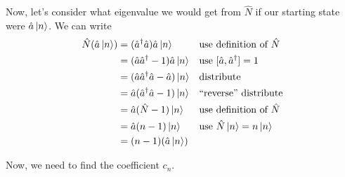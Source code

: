 \begin{questions}
		\contdnewpg
		\question Now, let's consider what eigenvalue we would get from $\hat N$ if our starting state were $\hat a \ket{n}$.  We can write
			\begin{align*}
				\hat N(\hat a \ket{n}) &= (\hat a^\dag \hat a)\hat a \ket{n} && \text{use definition of $\hat N$} \\
				 &= (\hat a \hat a^\dag - 1)\hat a \ket{n} && \text{use }[\hat a,\hat a^\dag] = 1 \\
				 &= (\hat a \hat a^\dag \hat a - \hat a)\ket{n} && \text{distribute}\\
				 &= \hat a(\hat a^\dag \hat a - 1)\ket{n} && \text{``reverse'' distribute}\\
				 &= \hat a(\hat N - 1)\ket{n} && \text{use definition of $\hat N$}\\
				 &= \hat a (n-1) \ket{n} && \text{use $\hat N \ket{n} = n\ket{n}$}\\
				 &= (n-1)(\hat a \ket{n})
			\end{align*}
			
		\contdnewpg
		\question Now, we need to find the coefficient $c_n$.
		

\end{questions}
